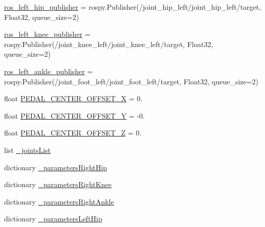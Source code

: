 \begin{DoxyCompactItemize}
\item 
\mbox{\hyperlink{namespacepedal__simulation__interpolation__lennard_a3b95457dc011945469fc488ba432e754}{ros\+\_\+left\+\_\+hip\+\_\+publisher}} = rospy.\+Publisher(\textquotesingle{}/joint\+\_\+hip\+\_\+left/joint\+\_\+hip\+\_\+left/target\textquotesingle{}, Float32, queue\+\_\+size=2)
\item 
\mbox{\hyperlink{namespacepedal__simulation__interpolation__lennard_a438877c23b8077f4602d83a386bf43f6}{ros\+\_\+left\+\_\+knee\+\_\+publisher}} = rospy.\+Publisher(\textquotesingle{}/joint\+\_\+knee\+\_\+left/joint\+\_\+knee\+\_\+left/target\textquotesingle{}, Float32, queue\+\_\+size=2)
\item 
\mbox{\hyperlink{namespacepedal__simulation__interpolation__lennard_a2815e9f74bc95113d8d6ed126914907c}{ros\+\_\+left\+\_\+ankle\+\_\+publisher}} = rospy.\+Publisher(\textquotesingle{}/joint\+\_\+foot\+\_\+left/joint\+\_\+foot\+\_\+left/target\textquotesingle{}, Float32, queue\+\_\+size=2)
\item 
float \mbox{\hyperlink{namespacepedal__simulation__interpolation__lennard_a5ce39eac5bbbdea0c44fb87736773505}{P\+E\+D\+A\+L\+\_\+\+C\+E\+N\+T\+E\+R\+\_\+\+O\+F\+F\+S\+E\+T\+\_\+X}} = 0.
\item 
float \mbox{\hyperlink{namespacepedal__simulation__interpolation__lennard_abc781674212251b058c2642319d0f8a7}{P\+E\+D\+A\+L\+\_\+\+C\+E\+N\+T\+E\+R\+\_\+\+O\+F\+F\+S\+E\+T\+\_\+Y}} = -\/0.
\item 
float \mbox{\hyperlink{namespacepedal__simulation__interpolation__lennard_a28d20a333c9810cf25891dca9f2e5f5e}{P\+E\+D\+A\+L\+\_\+\+C\+E\+N\+T\+E\+R\+\_\+\+O\+F\+F\+S\+E\+T\+\_\+Z}} = 0.
\item 
list \mbox{\hyperlink{namespacepedal__simulation__interpolation__lennard_a7217d20d124583dc667028f31053ad34}{\+\_\+joints\+List}}
\item 
dictionary \mbox{\hyperlink{namespacepedal__simulation__interpolation__lennard_aae15ab504edd4e2899f493cbc45dd161}{\+\_\+parameters\+Right\+Hip}}
\item 
dictionary \mbox{\hyperlink{namespacepedal__simulation__interpolation__lennard_a3281312a5206f0903adec5cde2a2dcd4}{\+\_\+parameters\+Right\+Knee}}
\item 
dictionary \mbox{\hyperlink{namespacepedal__simulation__interpolation__lennard_a2344ad01ad871942e95974c840476636}{\+\_\+parameters\+Right\+Ankle}}
\item 
dictionary \mbox{\hyperlink{namespacepedal__simulation__interpolation__lennard_adbc8c1d48608d49593f53abd6b081bcd}{\+\_\+parameters\+Left\+Hip}}

\end{DoxyCompactItemize}
